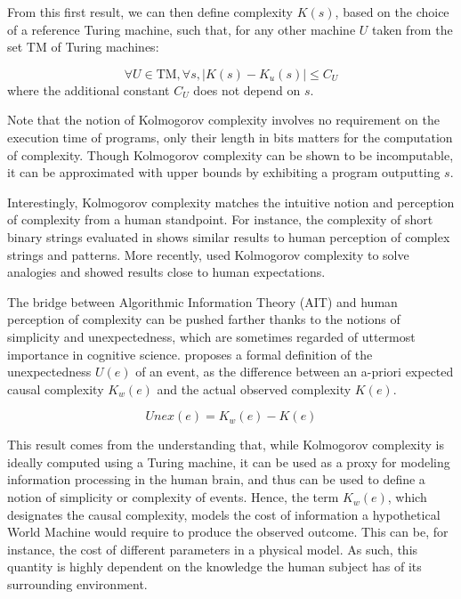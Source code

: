 \documentclass[entropy,article,submit,moreauthors,pdftex]{Definitions/mdpi}
\begin{document}
From this first result, we can then define complexity $K(s)$, based on the choice of a reference Turing machine, such that, for any other
machine $U$ taken from the set $\text{TM}$ of Turing machines:

\begin{equation}
    \forall U\in\text{TM}, \forall s, |K(s) - K_{u}(s)| \le C_{U}
\end{equation}
where the additional constant $C_{U}$ does not depend on $s$.

Note that the notion of Kolmogorov complexity involves no requirement on the execution time of
programs, only their length in bits matters for the computation of
complexity. Though Kolmogorov complexity can be shown to be
incomputable\cite{li_introduction_2008},
it can be approximated with
upper bounds by exhibiting a program outputting $s$.

Interestingly, Kolmogorov complexity matches the intuitive
notion and perception of complexity from a human standpoint. For instance, the
complexity of short binary strings evaluated in \cite{delahaye_numerical_2012}
shows similar results to human perception of complex strings and patterns. More
recently, \cite{murena_solving_2020} used Kolmogorov complexity to solve
analogies and showed results close to human expectations.

The bridge between Algorithmic Information Theory (AIT) and human perception of
complexity can be pushed farther thanks to the notions of simplicity and unexpectedness,
which are sometimes regarded of uttermost importance in cognitive science\cite
{chater_simplicity_2003}.
\cite{dessalles2011coincidences} proposes a formal definition of the
unexpectedness $U(e)$ of an event, as the difference between an a-priori
expected causal complexity $K_{w}(e)$ and the actual observed complexity $K
    (e)$.

\begin{equation}
    \label{eq:unexpected} \textit{Unex}(e) = K_{w}(e) - K(e)
\end{equation}

This result comes from the understanding that, while Kolmogorov complexity is
ideally computed using a Turing machine, it can be used as a proxy for modeling
information processing in the human brain, and thus can be used to define a notion of
simplicity or complexity of events. Hence, the term $K_w(e)$, which designates the causal complexity, models the cost of information a hypothetical World Machine would require to produce the observed outcome. This can be, for instance, the cost of different parameters in a physical model. As such, this quantity is highly dependent on the knowledge the human subject has of its surrounding environment.
\end{document}
